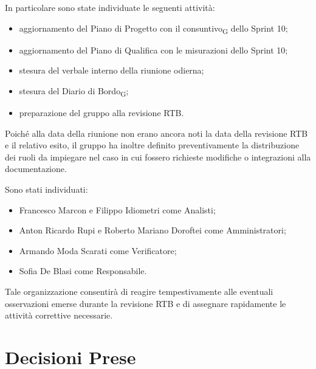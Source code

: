 In particolare sono state individuate le seguenti attività:

\begin{itemize}
\item aggiornamento del Piano di Progetto con il consuntivo\textsubscript{G} dello Sprint 10;
\item aggiornamento del Piano di Qualifica con le misurazioni dello Sprint 10;
\item stesura del verbale interno della riunione odierna;
\item stesura del Diario di Bordo\textsubscript{G};
\item preparazione del gruppo alla revisione RTB.
\end{itemize}

Poiché alla data della riunione non erano ancora noti la data della revisione RTB e il relativo esito, il gruppo ha inoltre definito preventivamente la distribuzione dei ruoli da impiegare nel caso in cui fossero richieste modifiche o integrazioni alla documentazione.

Sono stati individuati:

\begin{itemize}
\item Francesco Marcon e Filippo Idiometri come Analisti;
\item Anton Ricardo Rupi e Roberto Mariano Doroftei come Amministratori;
\item Armando Moda Scarati come Verificatore;
\item Sofia De Blasi come Responsabile.
\end{itemize}

Tale organizzazione consentirà di reagire tempestivamente alle eventuali osservazioni emerse durante la revisione RTB e di assegnare rapidamente le attività correttive necessarie.

\section{Decisioni Prese}

